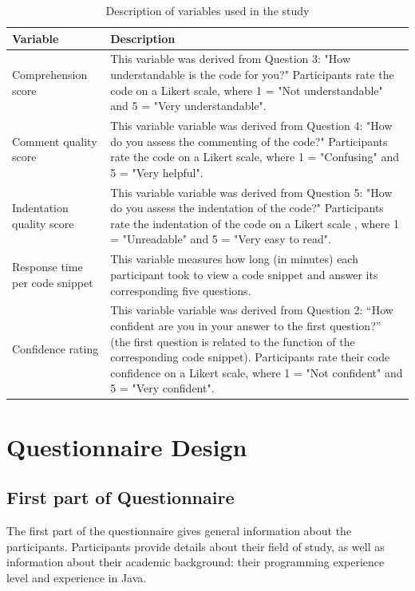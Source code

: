 \begin{table}[ht]
\centering
\small
\begin{tabular}{|p{4cm}|p{10cm}|}
\hline
\textbf{Variable} & \textbf{Description} \\
\hline
Comprehension score & This variable was derived from Question 3: "How understandable is the code for you?" Participants rate the code on a Likert scale, where 1 = "Not understandable" and  5 = "Very understandable".  \\
\hline
Comment quality score & This variable variable was derived from Question 4: "How do you assess the commenting of the code?" Participants rate the code on a Likert scale, where 1 = "Confusing" and 5  = "Very helpful". \\
\hline
Indentation quality score & This variable variable was derived from Question 5: "How do you assess the indentation of the code?" Participants rate the indentation of the code on  a Likert scale , where 1 = "Unreadable" and 5 = "Very easy to read". \\
\hline
Response time per code snippet & This variable measures how long (in minutes) each participant took to view a code snippet and answer its corresponding five questions.  \\
\hline
Confidence rating & This variable variable was derived from Question 2: “How confident are you in your answer to the first question?” (the first question is related to the function of the corresponding code snippet).  Participants rate their code confidence on a Likert scale, where 1 = "Not confident" and  5 = "Very confident".\\
\hline
\end{tabular}
\caption{Description of variables used in the study}
\label{tab:variables}
\end{table}



\section{Questionnaire Design}


\subsection{First part of Questionnaire}
The first part of the questionnaire gives general information about the participants. 
Participants provide details about their field of study, as well as information about their academic background: their programming experience level and experience in Java.

